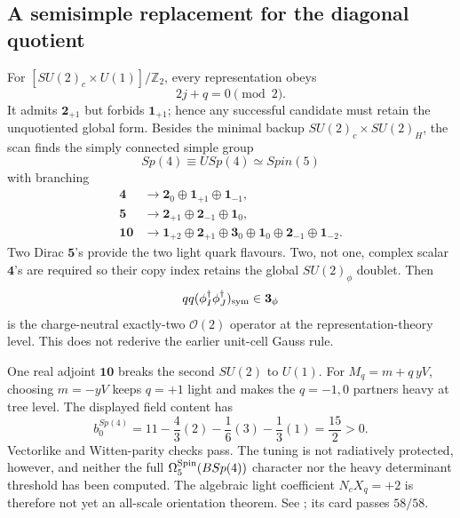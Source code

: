 \documentclass[11pt]{article}
\numberwithin{equation}{section}
\begin{document}
\subsection{A semisimple replacement for the diagonal quotient}

For
\([SU(2)_c\times U(1)]/\mathbb Z_2\), every representation obeys
\begin{equation}
 2j+q=0\pmod2.
 \label{eq:frontier-global-parity}
\end{equation}
It admits \(\bm2_{+1}\) but forbids \(\bm1_{+1}\); hence any successful
candidate must retain the unquotiented global form.  Besides the minimal
backup \(SU(2)_c\times SU(2)_H\), the scan finds the simply connected simple
group
\begin{equation}
 Sp(4)\equiv USp(4)\simeq Spin(5)
 \label{eq:frontier-sp4}
\end{equation}
with branching
\begin{align}
 \bm4&\longrightarrow
 \bm2_0\oplus\bm1_{+1}\oplus\bm1_{-1},\nonumber\\
 \bm5&\longrightarrow
 \bm2_{+1}\oplus\bm2_{-1}\oplus\bm1_0,\nonumber\\
 \bm{10}&\longrightarrow
 \bm1_{+2}\oplus\bm2_{+1}\oplus\bm3_0\oplus\bm1_0
 \oplus\bm2_{-1}\oplus\bm1_{-2}.
 \label{eq:frontier-sp4-branching}
\end{align}
Two Dirac \(\bm5\)'s provide the two light quark flavours.  Two, not one,
complex scalar \(\bm4\)'s are required so their copy index retains the
global \(SU(2)_\phi\) doublet.  Then
\begin{equation}
 qq(\phi_I^\dagger\phi_J^\dagger)_{\rm sym}
 \in\bm3_\phi
 \label{eq:frontier-sp4-operator}
\end{equation}
is the charge-neutral exactly-two \(\mathcal O(2)\) operator at the
representation-theory level.  This does not rederive the earlier unit-cell
Gauss rule.

One real adjoint \(\bm{10}\) breaks the second \(SU(2)\) to \(U(1)\).
For \(M_q=m+q\,yV\), choosing \(m=-yV\) keeps \(q=+1\) light and makes the
\(q=-1,0\) partners heavy at tree level.  The displayed field content has
\begin{equation}
 b_0^{Sp(4)}
 =11-\frac43(2)-\frac16(3)-\frac13(1)
 =\frac{15}{2}>0.
 \label{eq:frontier-sp4-beta}
\end{equation}
Vectorlike and Witten-parity checks pass.  The tuning is not radiatively
protected, however, and neither the full
\(\Omega_5^{\rm Spin}(BSp(4))\) character nor the heavy determinant
threshold has been computed.  The algebraic light coefficient
\(N_cX_q=+2\) is therefore not yet an all-scale orientation theorem.  See
; its card passes
\(58/58\).
\end{document}

